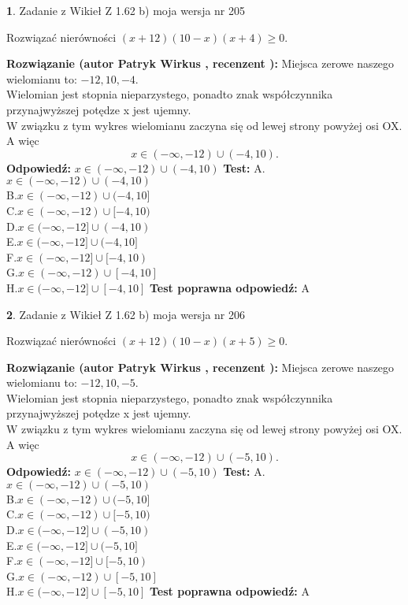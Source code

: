 \documentclass[12pt, a4paper]{article}
\theoremstyle{definition} %
\newtheorem{zad}{}
\newcommand{\zadStart}[1]{\begin{zad}#1\newline}
\newcommand{\zadStop}{\end{zad}}
\newcommand{\rozwStart}[2]{\noindent \textbf{Rozwiązanie (autor #1 , recenzent #2): }\newline}
\newcommand{\rozwStop}{\newline}
\newcommand{\odpStart}{\noindent \textbf{Odpowiedź:}\newline}
\newcommand{\odpStop}{\newline}
\newcommand{\testStart}{\noindent \textbf{Test:}\newline}
\newcommand{\testStop}{\newline}
\newcommand{\kluczStart}{\noindent \textbf{Test poprawna odpowiedź:}\newline}
\newcommand{\kluczStop}{\newline}
\begin{document}
\zadStart{Zadanie z Wikieł Z 1.62 b) moja wersja nr 205}

Rozwiązać nierówności $(x+12)(10-x)(x+4)\ge0$.
\zadStop
\rozwStart{Patryk Wirkus}{}
Miejsca zerowe naszego wielomianu to: $-12, 10, -4$.\\
Wielomian jest stopnia nieparzystego, ponadto znak współczynnika przy\linebreak najwyższej potędze x jest ujemny.\\ W związku z tym wykres wielomianu zaczyna się od lewej strony powyżej osi OX. A więc $$x \in (-\infty,-12) \cup (-4,10).$$
\rozwStop
\odpStart
$x \in (-\infty,-12) \cup (-4,10)$
\odpStop
\testStart
A.$x \in (-\infty,-12) \cup (-4,10)$\\
B.$x \in (-\infty,-12) \cup (-4,10]$\\
C.$x \in (-\infty,-12) \cup [-4,10)$\\
D.$x \in (-\infty,-12] \cup (-4,10)$\\
E.$x \in (-\infty,-12] \cup (-4,10]$\\
F.$x \in (-\infty,-12] \cup [-4,10)$\\
G.$x \in (-\infty,-12) \cup [-4,10]$\\
H.$x \in (-\infty,-12] \cup [-4,10]$
\testStop
\kluczStart
A
\kluczStop



\zadStart{Zadanie z Wikieł Z 1.62 b) moja wersja nr 206}

Rozwiązać nierówności $(x+12)(10-x)(x+5)\ge0$.
\zadStop
\rozwStart{Patryk Wirkus}{}
Miejsca zerowe naszego wielomianu to: $-12, 10, -5$.\\
Wielomian jest stopnia nieparzystego, ponadto znak współczynnika przy\linebreak najwyższej potędze x jest ujemny.\\ W związku z tym wykres wielomianu zaczyna się od lewej strony powyżej osi OX. A więc $$x \in (-\infty,-12) \cup (-5,10).$$
\rozwStop
\odpStart
$x \in (-\infty,-12) \cup (-5,10)$
\odpStop
\testStart
A.$x \in (-\infty,-12) \cup (-5,10)$\\
B.$x \in (-\infty,-12) \cup (-5,10]$\\
C.$x \in (-\infty,-12) \cup [-5,10)$\\
D.$x \in (-\infty,-12] \cup (-5,10)$\\
E.$x \in (-\infty,-12] \cup (-5,10]$\\
F.$x \in (-\infty,-12] \cup [-5,10)$\\
G.$x \in (-\infty,-12) \cup [-5,10]$\\
H.$x \in (-\infty,-12] \cup [-5,10]$
\testStop
\kluczStart
A
\kluczStop
\end{document}
